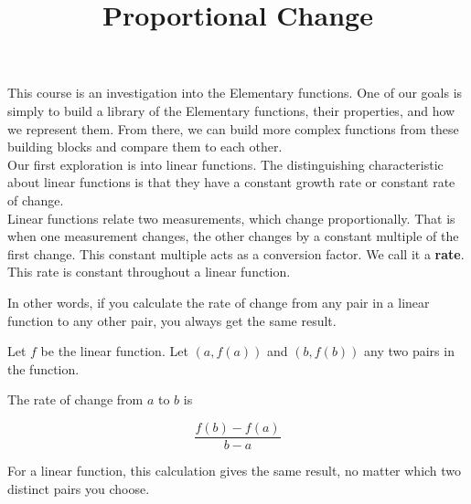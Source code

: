 \documentclass{ximera}
\title{Proportional Change}
\begin{document}
\begin{abstract}
\end{abstract}
\maketitle





This course is an investigation into the Elementary functions.  One of our goals is simply to build a library of the Elementary functions, their properties, and how we represent them.  From there, we can build more complex functions from these building blocks and compare them to each other. \\



Our first exploration is into linear functions. The distinguishing characteristic about linear functions is that they have a constant growth rate or constant rate of change.  \\




Linear functions relate two measurements, which change proportionally.  That is when one measurement changes, the other changes by a constant multiple of the first change.  This constant multiple acts as a conversion factor.  We call it a \textbf{\textcolor{purple!85!blue}{rate}}. \\



This rate is constant throughout a linear function.





In other words, if you calculate the rate of change from any pair in a linear function to any other pair, you always get the same result.

Let $f$ be the linear function.  Let $(a, f(a))$ and $(b, f(b))$ any two pairs in the function.

The rate of change from $a$ to $b$ is 

\[
\frac{f(b) - f(a)}{b-a}
\]


For a linear function, this calculation gives the same result, no matter which two distinct pairs you choose.
\end{document}
